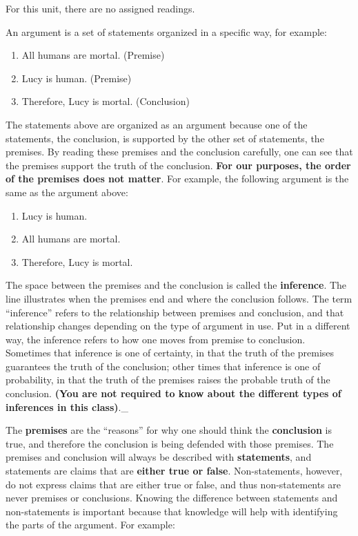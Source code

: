\documentclass[
]{book}
\begin{document}
For this unit, there are no assigned readings.

An argument is a set of statements organized in a specific way, for example:

\begin{enumerate}
\def\labelenumi{\arabic{enumi}.}
\item
  All humans are mortal. (Premise)
\item
  Lucy is human. (Premise)
\item
  Therefore, Lucy is mortal. (Conclusion)
\end{enumerate}

The statements above are organized as an argument because one of the statements, the conclusion, is supported by the other set of statements, the premises. By reading these premises and the conclusion carefully, one can see that the premises support the truth of the conclusion. \textbf{For our purposes, the order of the premises does not matter}. For example, the following argument is the same as the argument above:

\begin{enumerate}
\def\labelenumi{\arabic{enumi}.}
\item
  Lucy is human.
\item
  All humans are mortal.
\item
  Therefore, Lucy is mortal.
\end{enumerate}

The space between the premises and the conclusion is called the \textbf{inference}. The line illustrates when the premises end and where the conclusion follows. The term ``inference'' refers to the relationship between premises and conclusion, and that relationship changes depending on the type of argument in use. Put in a different way, the inference refers to how one moves from premise to conclusion. Sometimes that inference is one of certainty, in that the truth of the premises guarantees the truth of the conclusion; other times that inference is one of probability, in that the truth of the premises raises the probable truth of the conclusion. \textbf{(You are not required to know about the different types of inferences in this class)}.\_

The \textbf{premises} are the ``reasons'' for why one should think the \textbf{conclusion} is true, and therefore the conclusion is being defended with those premises. The premises and conclusion will always be described with \textbf{statements}, and statements are claims that are \textbf{either true or false}. Non-statements, however, do not express claims that are either true or false, and thus non-statements are never premises or conclusions. Knowing the difference between statements and non-statements is important because that knowledge will help with identifying the parts of the argument. For example:
\end{document}
